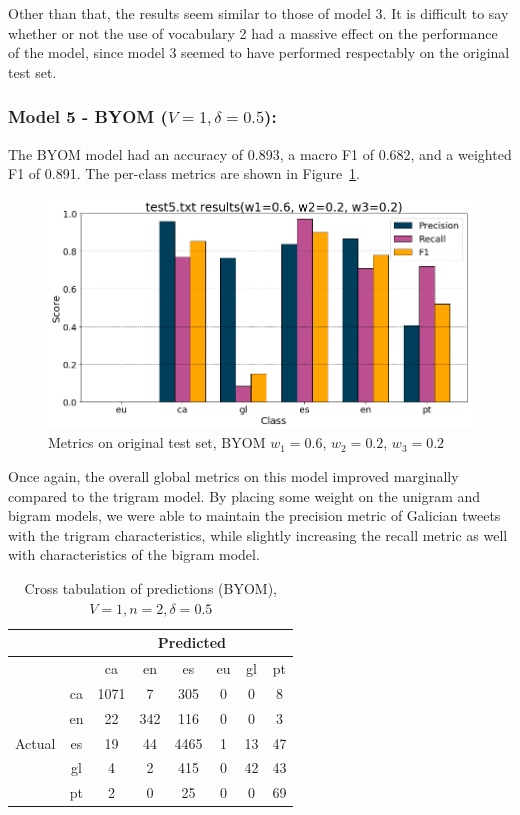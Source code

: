 \documentclass[runningheads]{llncs}
\begin{document}
Other than that, the results seem similar to those of model 3. It is difficult to say whether or not the use of vocabulary 2 had a massive effect on the performance of the model, since model 3 seemed to have performed respectably on the original test set.



\subsubsection{Model 5 - BYOM ($V=1, \delta=0.5$): }
The BYOM model had an accuracy of 0.893, a macro F1 of 0.682, and a weighted F1 of 0.891. The per-class metrics are shown in Figure~\ref{fig:demo_BYOM}. \\

\begin{figure}
    \begin{center}
        \includegraphics[width=12.5cm]{images/test5_results_BYOM.png}
        \caption{Metrics on original test set, BYOM $w_1=0.6$, $w_2=0.2$, $w_3=0.2$}
        \label{fig:demo_BYOM}
    \end{center}
\end{figure}

Once again, the overall global metrics on this model improved marginally compared to the trigram model. By placing some weight on the unigram and bigram models, we were able to maintain the precision metric of Galician tweets with the trigram characteristics, while slightly increasing the recall metric as well with characteristics of the bigram model.

\begin{table}
	\centering
	\caption{Cross tabulation of predictions (BYOM), $V=1, n=2, \delta=0.5$}
	\label{tab:demo_confusion_BYOM}
		\begin{tabular}{|c|c|c|c|c|c|c|c|} \hline
		& & \multicolumn{6}{c|}{Predicted} \\ \hline
		& &  ca &   en &    es &  eu &  gl &  pt \\ \hline
		\multirow{6}{*}{Actual} & ca   &  1071 &    7 &   305 &   0 &   0 &   8 \\
		& en   &    22 &  342 &   116 &   0 &   0 &   3 \\
		& es   &    19 &   44 &  4465 &   1 &  13 &  47 \\
		& gl   &     4 &    2 &   415 &   0 &  42 &  43 \\
		& pt   &     2 &    0 &    25 &   0 &   0 &  69 \\ \hline
    \end{tabular}
\end{table}
\end{document}
